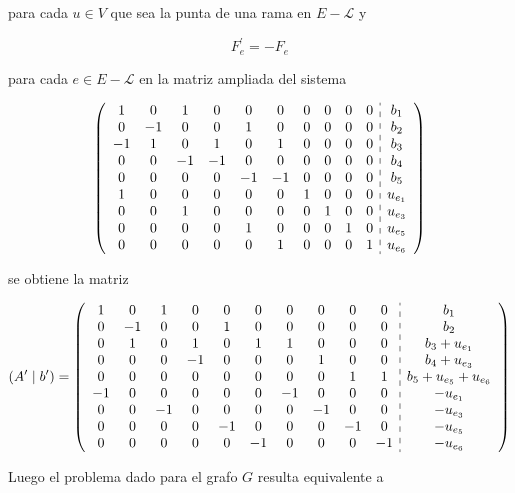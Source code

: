 \documentclass[10pt]{article}
\begin{document}
para cada $u \in V$ que sea la punta de una rama en $E-\mathcal{L}$ y

$$
F_{e}^{\prime}=-F_{e}
$$

para cada $e \in E-\mathcal{L}$ en la matriz ampliada del sistema

$$
\left(\begin{array}{cccccccccc:c}
1 & 0 & 1 & 0 & 0 & 0 & 0 & 0 & 0 & 0 & b_{1} \\
0 & -1 & 0 & 0 & 1 & 0 & 0 & 0 & 0 & 0 & b_{2} \\
-1 & 1 & 0 & 1 & 0 & 1 & 0 & 0 & 0 & 0 & b_{3} \\
0 & 0 & -1 & -1 & 0 & 0 & 0 & 0 & 0 & 0 & b_{4} \\
0 & 0 & 0 & 0 & -1 & -1 & 0 & 0 & 0 & 0 & b_{5} \\
1 & 0 & 0 & 0 & 0 & 0 & 1 & 0 & 0 & 0 & u_{e_{1}} \\
0 & 0 & 1 & 0 & 0 & 0 & 0 & 1 & 0 & 0 & u_{e_{3}} \\
0 & 0 & 0 & 0 & 1 & 0 & 0 & 0 & 1 & 0 & u_{e_{5}} \\
0 & 0 & 0 & 0 & 0 & 1 & 0 & 0 & 0 & 1 & u_{e_{6}}
\end{array}\right)
$$

se obtiene la matriz

$$
\left(A^{\prime} \mid b^{\prime}\right)=\left(\begin{array}{cccccccccc:c}
1 & 0 & 1 & 0 & 0 & 0 & 0 & 0 & 0 & 0 & b_{1} \\
0 & -1 & 0 & 0 & 1 & 0 & 0 & 0 & 0 & 0 & b_{2} \\
0 & 1 & 0 & 1 & 0 & 1 & 1 & 0 & 0 & 0 & b_{3}+u_{e_{1}} \\
0 & 0 & 0 & -1 & 0 & 0 & 0 & 1 & 0 & 0 & b_{4}+u_{e_{3}} \\
0 & 0 & 0 & 0 & 0 & 0 & 0 & 0 & 1 & 1 & b_{5}+u_{e_{5}}+u_{e_{6}} \\
-1 & 0 & 0 & 0 & 0 & 0 & -1 & 0 & 0 & 0 & -u_{e_{1}} \\
0 & 0 & -1 & 0 & 0 & 0 & 0 & -1 & 0 & 0 & -u_{e_{3}} \\
0 & 0 & 0 & 0 & -1 & 0 & 0 & 0 & -1 & 0 & -u_{e_{5}} \\
0 & 0 & 0 & 0 & 0 & -1 & 0 & 0 & 0 & -1 & -u_{e_{6}}
\end{array}\right)
$$

Luego el problema dado para el grafo $G$ resulta equivalente a
\end{document}
